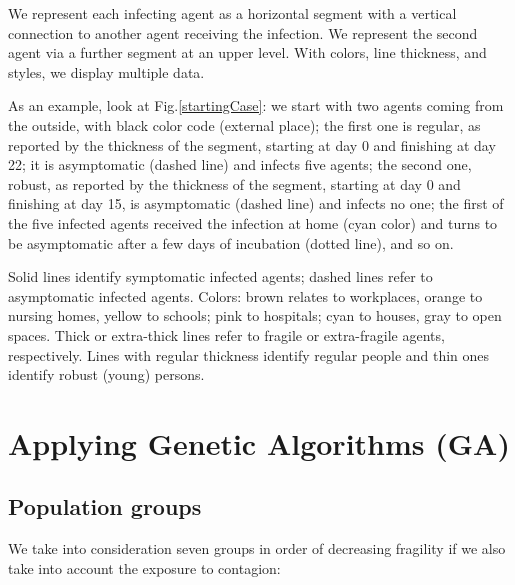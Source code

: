 \documentclass[graybox]{svmult}
\begin{document}
We represent each infecting agent as a horizontal segment with a vertical connection to another agent receiving the infection. We represent the second agent via a further segment at an upper level. With colors, line thickness, and styles, we display multiple data. 

As an example, look at Fig.\ref{startingCase}: we start with two agents coming from the outside, with black color code (external place); the first one is regular, as reported by the thickness of the segment, starting at day 0 and finishing at day 22; it is asymptomatic (dashed line) and infects five agents; the second one, robust, as reported by the thickness of the segment, starting at day 0 and finishing at day 15, is asymptomatic (dashed line) and infects no one; the first of the five infected agents received the infection at home (cyan color) and turns to be asymptomatic after a few days of incubation (dotted line), and so on. 

Solid lines identify symptomatic infected agents; dashed lines refer to asymptomatic infected agents. Colors: brown relates to workplaces, orange to nursing homes, yellow to schools; pink to hospitals; cyan to houses, gray to open spaces. Thick or extra-thick lines refer to fragile or extra-fragile agents, respectively. Lines with regular thickness identify regular people and thin ones identify robust (young) persons.


\section{Applying Genetic Algorithms (GA)}
\label{GA}

\subsection{Population groups}
\label{groups}

We take into consideration seven groups in order of decreasing fragility if we also take into account the exposure to contagion:
\end{document}
